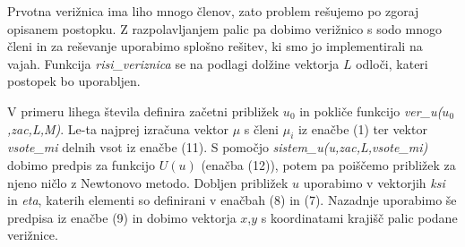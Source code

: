 \documentclass[A4paper, 11pt]{article}
\begin{document}
Prvotna verižnica ima liho mnogo členov, zato problem rešujemo po zgoraj opisanem postopku. Z razpolavljanjem palic pa dobimo verižnico s sodo mnogo členi in za reševanje uporabimo splošno rešitev, ki smo jo implementirali na vajah. Funkcija \textit{risi\_veriznica} se na podlagi dolžine vektorja $L$ odloči, kateri postopek bo uporabljen.

V primeru lihega števila definira začetni približek $u_0$ in pokliče funkcijo \textit{ver\_u($u_0$,zac,L,M)}. Le-ta najprej izračuna vektor $\mu$ s členi $\mu_i$ iz enačbe (1) ter vektor \textit{vsote\_mi} delnih vsot iz enačbe (11). S pomočjo \textit{sistem\_u(u,zac,L,vsote\_mi)} dobimo predpis za funkcijo $U(u)$ (enačba (12)), potem pa poiščemo približek za njeno ničlo z Newtonovo metodo. Dobljen približek $u$ uporabimo v vektorjih \textit{ksi} in \textit{eta}, katerih elementi so definirani v enačbah (8) in (7). Nazadnje uporabimo še predpisa iz enačbe (9) in dobimo vektorja $x$,$y$ s koordinatami krajišč palic podane verižnice.


\end{document}
